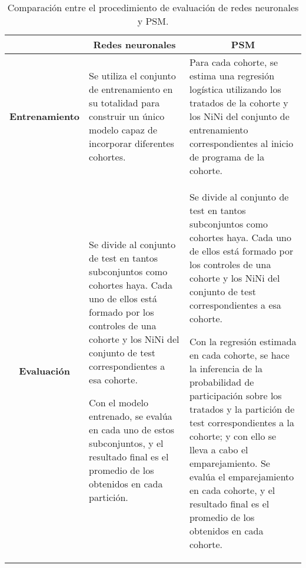\documentclass[../../main.tex]{subfiles}
\begin{document}
\begin{table}[ht]
    \centering
    \renewcommand{\arraystretch}{1.3} %
    \begin{tabularx}{\textwidth}{|c|X|X|}
        \hline
         & \multicolumn{1}{c|}{\textbf{Redes neuronales}} & \multicolumn{1}{c|}{\textbf{PSM}} \\ \hline
        \textbf{Entrenamiento}
            & Se utiliza el conjunto de entrenamiento en su totalidad para construir
            un único modelo capaz de incorporar diferentes cohortes.

            & Para cada cohorte, se estima una regresión logística utilizando los tratados
            de la cohorte y los NiNi del conjunto de entrenamiento correspondientes al
            inicio de programa de la cohorte. %
        \\ \hline
        \textbf{Evaluación}
            & Se divide al conjunto de test en tantos subconjuntos como cohortes haya.
            Cada uno de ellos está formado por los controles de una cohorte y los NiNi
            del conjunto de test correspondientes a esa cohorte.

            Con el modelo entrenado, se evalúa en cada uno de estos subconjuntos, y el
            resultado final es el promedio de los obtenidos en cada partición.

            & Se divide al conjunto de test en tantos subconjuntos como cohortes haya.
            Cada uno de ellos está formado por los controles de una cohorte y los NiNi
            del conjunto de test correspondientes a esa cohorte.

            Con la regresión estimada en cada cohorte, se hace la inferencia de la
            probabilidad de participación sobre los tratados y la partición de test
            correspondientes a la cohorte; y con ello se lleva a cabo el emparejamiento.
            Se evalúa el emparejamiento en cada cohorte, y el resultado final es el
            promedio de los obtenidos en cada cohorte.
        \\ \hline
    \end{tabularx}
    \caption{Comparación entre el procedimiento de evaluación de redes neuronales y PSM.}
    \label{tab:comparacion}
\end{table}
\end{document}
